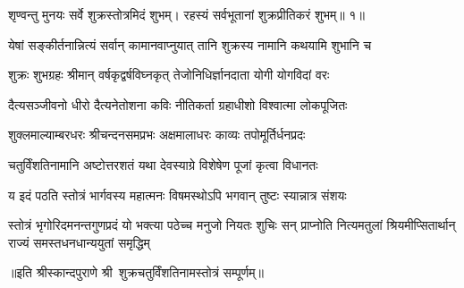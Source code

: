 

\twolineshloka
{शृण्वन्तु मुनयः सर्वे शुक्रस्तोत्रमिदं शुभम्।}
{रहस्यं सर्वभूतानां शुक्रप्रीतिकरं शुभम्॥ १॥}

\twolineshloka
{येषां सङ्कीर्तनान्नित्यं सर्वान् कामानवाप्नुयात्}
{तानि शुक्रस्य नामानि कथयामि शुभानि च}

\twolineshloka
{शुक्रः शुभग्रहः श्रीमान् वर्षकृद्वर्षविघ्नकृत्}
{तेजोनिधिर्ज्ञानदाता योगी योगविदां वरः}

\twolineshloka
{दैत्यसञ्जीवनो धीरो दैत्यनेतोशना कविः}
{नीतिकर्ता ग्रहाधीशो विश्वात्मा लोकपूजितः}

\twolineshloka
{शुक्लमाल्याम्बरधरः श्रीचन्दनसमप्रभः}
{अक्षमालाधरः काव्यः तपोमूर्तिर्धनप्रदः}

\twolineshloka
{चतुर्विंशतिनामानि अष्टोत्तरशतं यथा}
{देवस्याग्रे विशेषेण पूजां कृत्वा विधानतः}

\twolineshloka
{य इदं पठति स्तोत्रं भार्गवस्य महात्मनः}
{विषमस्थोऽपि भगवान् तुष्टः स्यान्नात्र संशयः}

\fourlineindentedshloka
{स्तोत्रं भृगोरिदमनन्तगुणप्रदं यो}
{भक्त्या पठेच्च मनुजो नियतः शुचिः सन्}
{प्राप्नोति नित्यमतुलां श्रियमीप्सितार्थान्}
{राज्यं समस्तधनधान्ययुतां समृद्धिम्}

॥इति श्रीस्कान्दपुराणे श्री~शुक्रचतुर्विंशतिनामस्तोत्रं सम्पूर्णम्॥
